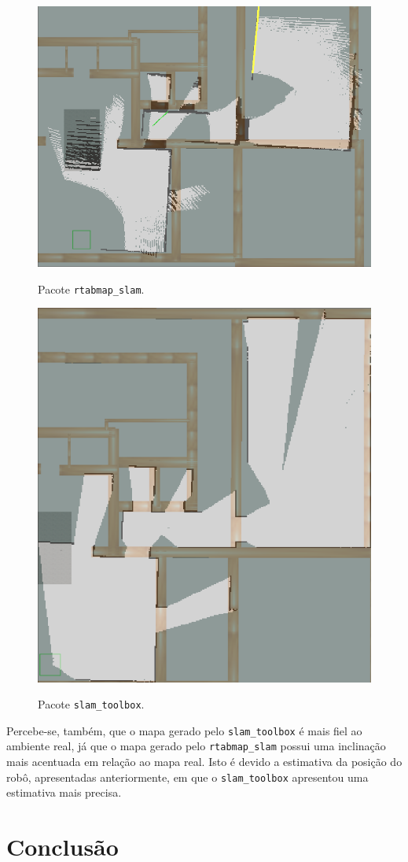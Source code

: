 \documentclass[repeatfields,xlists,xpacks,oneside,yearsonly]{ufrgscca}
\begin{document}
\begin{figure}[h]
    {
        \centering
        \caption{Pacote \texttt{rtabmap\_slam}.}
        \label{fig:mapping_rtabmap}
        \includegraphics[width=0.6\linewidth]{rtabmap_slam_map-compared.png}\\
    }
\end{figure}

\begin{figure}[h]
    {
        \centering
        \caption{Pacote \texttt{slam\_toolbox}.}
        \label{fig:mapping_slam_toolbox}
        \includegraphics[width=0.6\linewidth]{slam_toolbox_map-compared.png}\\
    }
\end{figure}

Percebe-se, também, que o mapa gerado pelo \texttt{slam\_toolbox} é mais fiel ao
ambiente real, já que o mapa gerado pelo \texttt{rtabmap\_slam} possui uma inclinação
mais acentuada em relação ao mapa real.
Isto é devido a estimativa da posição do robô, apresentadas anteriormente, em que
o \texttt{slam\_toolbox} apresentou uma estimativa mais precisa.

\chapter{Conclusão}
\label{conclusao}


\printbibliography

%
%
%
\end{document}
